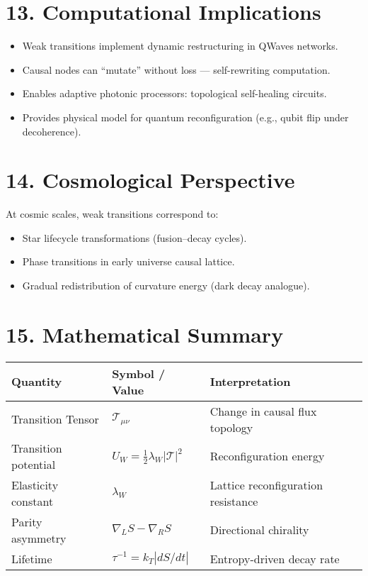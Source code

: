 \documentclass[11pt,a4paper]{article}
\begin{document}
\section{13. Computational Implications}
\begin{itemize}
\item Weak transitions implement dynamic restructuring in QWaves networks.  
\item Causal nodes can ``mutate'' without loss — self-rewriting computation.  
\item Enables adaptive photonic processors: topological self-healing circuits.  
\item Provides physical model for quantum reconfiguration (e.g., qubit flip under decoherence).  
\end{itemize}

\section{14. Cosmological Perspective}
At cosmic scales, weak transitions correspond to:
\begin{itemize}
\item Star lifecycle transformations (fusion–decay cycles).  
\item Phase transitions in early universe causal lattice.  
\item Gradual redistribution of curvature energy (dark decay analogue).  
\end{itemize}

\section{15. Mathematical Summary}
\begin{longtable}{|l|l|l|}
\hline
\textbf{Quantity} & \textbf{Symbol / Value} & \textbf{Interpretation} \\
\hline
Transition Tensor & $\mathcal{T}_{\mu\nu}$ & Change in causal flux topology \\
Transition potential & $U_W = \frac{1}{2}\lambda_W |\mathcal{T}|^2$ & Reconfiguration energy \\
Elasticity constant & $\lambda_W$ & Lattice reconfiguration resistance \\
Parity asymmetry & $\nabla_L S - \nabla_R S$ & Directional chirality \\
Lifetime & $\tau^{-1} = k_T |dS/dt|$ & Entropy-driven decay rate \\
\hline
\end{longtable}
\end{document}
